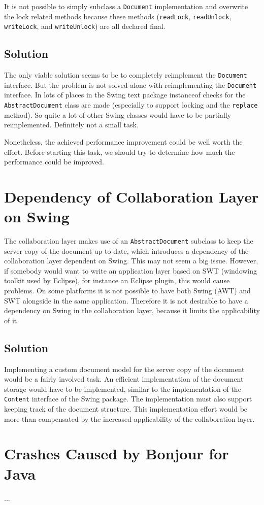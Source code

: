 It is not possible to simply subclass a \texttt{Document}
implementation and overwrite the lock related methods because these
methods (\texttt{read\-Lock}, \texttt{read\-Unlock}, \texttt{write\-Lock},
and \texttt{write\-Unlock}) are all declared final.


\subsection{Solution}
The only viable solution seems to be to completely reimplement the 
\texttt{Document} interface. But the problem is not solved alone with
reimplementing the \texttt{Document} interface. In lots of places in
the Swing text package instanceof checks for the
\texttt{Abstract\-Document} class are made (especially to support locking and
the \texttt{replace} method). So quite a lot of other Swing classes would
have to be partially reimplemented. Definitely not a small task.

Nonetheless, the achieved performance improvement could be well worth the 
effort. Before starting this task, we should try to determine how much
the performance could be improved.



\section{Dependency of Collaboration Layer on Swing}
The collaboration layer makes use of an \texttt{AbstractDocument} subclass to
keep the server copy of the document up-to-date, which introduces a
dependency of the collaboration
layer dependent on Swing. This may not seem a big issue. However, if 
somebody would want to write an application layer based on SWT (windowing
toolkit used by Eclipse), for instance an Eclipse plugin, this would
cause problems. On some platforms it is not possible to have both Swing (AWT)
and SWT alongside in the same application. Therefore it is not desirable
to have a dependency on Swing in the collaboration layer, because it limits
the applicability of it.


\subsection{Solution}
Implementing a custom document model for the server copy of the document
would be a fairly involved task. An efficient implementation of the
document storage would have to be implemented, similar to the implementation
of the \texttt{Content} interface of the Swing package. The implementation
must also support keeping track of the document structure. 
This implementation effort would be more than compensated by the 
increased applicability of the collaboration layer.



\section{Crashes Caused by Bonjour for Java}
...



